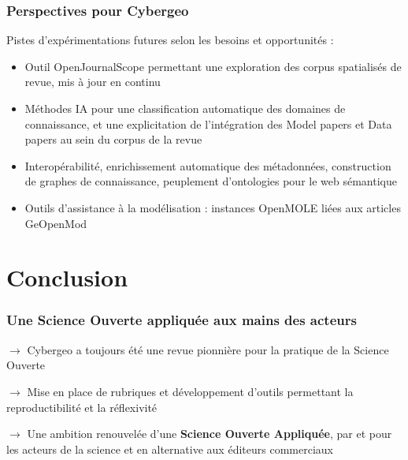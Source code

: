 \documentclass[english,10pt]{beamer}
\begin{document}
\begin{frame}
\frametitle{Perspectives pour Cybergeo}





Pistes d'expérimentations futures selon les besoins et opportunités :

\begin{itemize}
	\item Outil OpenJournalScope permettant une exploration des corpus spatialisés de revue, mis à jour en continu
	\item Méthodes IA pour une classification automatique des domaines de connaissance, et une explicitation de l'intégration des Model papers et Data papers au sein du corpus de la revue
	\item Interopérabilité, enrichissement automatique des métadonnées, construction de graphes de connaissance, peuplement d'ontologies pour le web sémantique
	\item Outils d'assistance à la modélisation : instances OpenMOLE liées aux articles GeOpenMod
\end{itemize}


\end{frame}


\section{Conclusion}


\begin{frame}
\frametitle{Une Science Ouverte appliquée aux mains des acteurs}

$\rightarrow$ Cybergeo a toujours été une revue pionnière pour la pratique de la Science Ouverte

\bigskip

$\rightarrow$ Mise en place de rubriques et développement d'outils permettant la reproductibilité et la réflexivité

\bigskip

$\rightarrow$ Une ambition renouvelée d'une \textbf{Science Ouverte Appliquée}, par et pour les acteurs de la science et en alternative aux éditeurs commerciaux


\end{frame}


%
%
\end{document}
